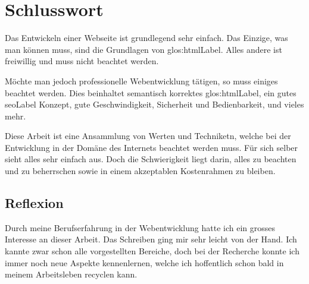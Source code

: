 \chapter{Schlusswort}
Das Entwickeln einer Webseite ist grundlegend sehr einfach. Das Einzige, was man können muss, sind die Grundlagen von \Gls{glos:htmlLabel}. Alles andere ist freiwillig und muss nicht beachtet werden.

Möchte man jedoch professionelle Webentwicklung tätigen, so muss einiges beachtet werden. Dies beinhaltet semantisch korrektes \Gls{glos:htmlLabel}, ein gutes \gls{seoLabel} Konzept, gute Geschwindigkeit, Sicherheit und Bedienbarkeit, und vieles mehr. 

Diese Arbeit ist eine Ansammlung von Werten und Techniketn, welche bei der Entwicklung in der Domäne des Internets beachtet werden muss. Für sich selber sieht alles sehr einfach aus. Doch die Schwierigkeit liegt darin, alles zu beachten und zu beherrschen sowie in einem akzeptablen Kostenrahmen zu bleiben.

\section{Reflexion}
Durch meine Berufserfahrung in der Webentwicklung hatte ich ein grosses Interesse an dieser Arbeit. Das Schreiben ging mir sehr leicht von der Hand. Ich kannte zwar schon alle vorgestellten Bereiche, doch bei der Recherche konnte ich immer noch neue Aspekte kennenlernen, welche ich hoffentlich schon bald in meinem Arbeitsleben recyclen kann.


\glsaddall
